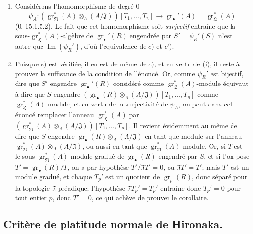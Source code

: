\begin{enumerate}
  \item[(i)] Considérons l'homomorphisme de degré $0$
  \[
    \psi_A:(\operatorname{gr}_{\mathfrak R}^*(A)\otimes_A(A/\mathfrak J))[T_1,\ldots,T_n]\longrightarrow\operatorname{gr}_\bullet'(A)=\operatorname{gr}_{\mathfrak L}^*(A)
  \]
  ($0$, 15.1.5.2). Le fait que cet homomorphisme soit \emph{surjectif} entraîne que la sous-$\operatorname{gr}_{\mathfrak L}^*(A)$-algèbre de $\operatorname{gr}_\bullet'(R)$ engendrée par $S'=\psi_R'(S)$ n'est autre que $\operatorname{Im}(\psi_R')$, d'où l'équivalence de $c)$ et $c')$.
  \item[(ii)] Puisque $e)$ est vérifiée, il en est de même de $c)$, et en vertu de (i), il reste à prouver la suffisance de la condition de l'énoncé. Or, comme $\psi_R'$ est bijectif, dire que $S'$ engendre $\operatorname{gr}_\bullet'(R)$ considéré comme $\operatorname{gr}_{\mathfrak L}^*(A)$-module équivaut à dire que $S$ engendre $(\operatorname{gr}_\bullet(R)\otimes_A(A/\mathfrak J))[T_1,\ldots,T_n]$ comme $\operatorname{gr}_{\mathfrak L}^*(A)$-module, et en vertu de la surjectivité de $\psi_A$, on peut dans cet énoncé remplacer l'anneau $\operatorname{gr}_{\mathfrak L}^*(A)$ par $(\operatorname{gr}_{\mathfrak R}^*(A)\otimes_A(A/\mathfrak J))[T_1,\ldots,T_n]$. Il revient évidemment au même de dire que $S$ engendre $\operatorname{gr}_\bullet(R)\otimes_A(A/\mathfrak J)$ en tant que module sur l'anneau $\operatorname{gr}_{\mathfrak R}^*(A)\otimes_A(A/\mathfrak J)$, ou aussi en tant que $\operatorname{gr}_{\mathfrak R}^*(A)$-module. Or, si $T$ est le sous-$\operatorname{gr}_{\mathfrak R}^*(A)$-module gradué de $\operatorname{gr}_\bullet(R)$ engendré par $S$, et si l'on pose $T'=\operatorname{gr}_\bullet(R)/T$, on a par hypothèse $T'/\mathfrak JT'=0$, ou $\mathfrak JT'=T'$; mais $T'$ est un module gradué, et chaque $T_p'$ est un quotient de $\operatorname{gr}_p(R)$, donc séparé pour la topologie $\mathfrak J$-préadique; l'hypothèse $\mathfrak JT_p'=T_p'$ entraîne donc $T_p'=0$ pour tout entier $p$, donc $T'=0$, ce qui achève de prouver le corollaire.
\end{enumerate}

\subsection{Critère de platitude normale de Hironaka.}
\label{subsection:IV.19.7}
\label{IV.19.7}

